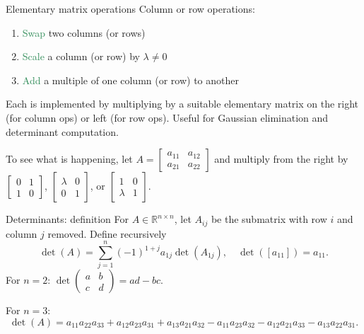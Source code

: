 \documentclass{beamer}
\begin{document}
\begin{frame}{Elementary matrix operations}
Column or row operations:
\begin{enumerate}
\item \textcolor{SeaGreen}{Swap} two columns (or rows)
\item \textcolor{SeaGreen}{Scale} a column (or row) by $\lambda\neq 0$
\item \textcolor{SeaGreen}{Add} a multiple of one column (or row) to another
\end{enumerate}
Each is implemented by multiplying by a suitable elementary matrix on the right (for column ops) or left (for row ops). Useful for Gaussian elimination and determinant computation.

\begin{block}{}
To see what is happening, let $A=\begin{bmatrix}
	a_{11} & a_{12}\\
	a_{21} & a_{22}
\end{bmatrix}$ and multiply from the right by $\begin{bmatrix}
	0 & 1\\
	1 & 0
\end{bmatrix}$, $\begin{bmatrix}
	\lambda & 0\\
	0 & 1
\end{bmatrix}$, or $\begin{bmatrix}
	1 & 0\\
	\lambda & 1
\end{bmatrix}$.
\end{block}

\end{frame}


\begin{frame}{Determinants: definition}
For $A\in\mathbb{R}^{n\times n}$, let $A_{ij}$ be the submatrix with row $i$ and column $j$ removed. Define recursively
\[
\det(A)=\sum_{j=1}^n (-1)^{1+j} a_{1j} \det(A_{1j}),\quad \det([a_{11}])=a_{11}.
\]
For $n=2$: $\det\begin{pmatrix}a&b\\ c&d\end{pmatrix}=ad-bc$.
\bigskip

For $n=3$:
\[
\det(A)=a_{11}a_{22}a_{33}+a_{12}a_{23}a_{31}+a_{13}a_{21}a_{32}
- a_{11}a_{23}a_{32}-a_{12}a_{21}a_{33}-a_{13}a_{22}a_{31}.
\]
\end{frame}
\end{document}
